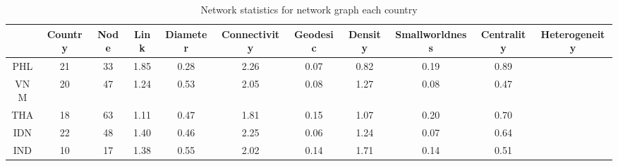 \begin{table} 
    \begin{tabular}{ c c c c c c c c c c c }
    \hline
         & Country & Node & Link & Diameter & Connectivity & Geodesic & Density & Smallworldness & Centrality & Heterogeneity \\ 
         \hline
         PHL & 21 & 33 & 1.85 & 0.28 & 2.26 & 0.07 & 0.82 & 0.19 & 0.89 \\ 
         VNM & 20 & 47 & 1.24 & 0.53 & 2.05 & 0.08 & 1.27 & 0.08 & 0.47 \\ 
         THA & 18 & 63 & 1.11 & 0.47 & 1.81 & 0.15 & 1.07 & 0.20 & 0.70 \\ 
         IDN & 22 & 48 & 1.40 & 0.46 & 2.25 & 0.06 & 1.24 & 0.07 & 0.64 \\ 
         IND & 10 & 17 & 1.38 & 0.55 & 2.02 & 0.14 & 1.71 & 0.14 & 0.51 \\ 
     \hline  
    \end{tabular} 
    \caption{Network statistics for network graph each country}
\label{table:Network_stat}
\end{table}